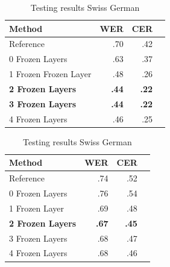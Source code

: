 \documentclass[11pt]{article}
\begin{document}
\begin{table}[ht]
    \begin{minipage}{.5\linewidth}
      \centering
        \begin{tabular}{lrrr}
            \toprule
            Method & WER & CER\\
            \midrule
            Reference & .70 & .42 \\
            0 Frozen Layers & .63 & .37 \\
            1 Frozen Frozen Layer & .48 & .26 \\
            \bf{2 Frozen Layers} & \bf{.44} & \bf{.22} \\
            \bf{3 Frozen Layers} & \bf{.44} & \bf{.22} \\
            4 Frozen Layers & .46 & .25 \\
            \bottomrule
        \end{tabular}
        \caption{Testing results German}
        \label{tab:results-de}
    \end{minipage}%
    \begin{minipage}{.5\linewidth}
      \centering
        \begin{tabular}{lrrr}
            \toprule
            Method & WER & CER\\
            \midrule
            Reference & .74 & .52 \\
            0 Frozen Layers & .76 & .54 \\
            1 Frozen Layer & .69 & .48 \\
            \bf{2 Frozen Layers} & \bf{.67} & \bf{.45} \\
            3 Frozen Layers & .68 & .47 \\
            4 Frozen Layers & .68 & .46 \\
            \bottomrule
        \end{tabular}
        \caption{Testing results Swiss German}
        \label{tab:results-ch}
    \end{minipage} 
\end{table}
\end{document}
